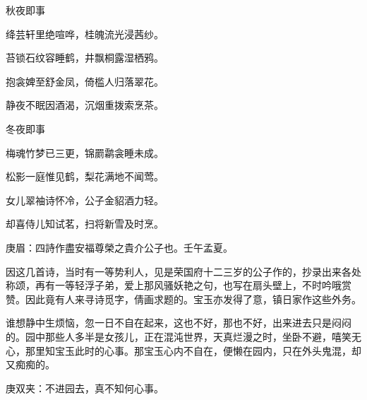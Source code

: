 \begin{poem}
    \begin{pl}秋夜即事\end{pl}

    \begin{pl}绛芸轩里绝喧哗，桂魄流光浸茜纱。\end{pl}

    \begin{pl}苔锁石纹容睡鹤，井飘桐露湿栖鸦。\end{pl}

    \begin{pl}抱衾婢至舒金凤，倚槛人归落翠花。\end{pl}

    \begin{pl}静夜不眠因酒渴，沉烟重拨索烹茶。\end{pl}

\end{poem}


\begin{poem}
    \begin{pl}冬夜即事\end{pl}

    \begin{pl}梅魂竹梦已三更，锦罽鹴衾睡未成。\end{pl}

    \begin{pl}松影一庭惟见鹤，梨花满地不闻莺。\end{pl}

    \begin{pl}女儿翠袖诗怀冷，公子金貂酒力轻。\end{pl}

    \begin{pl}却喜侍儿知试茗，扫将新雪及时烹。\end{pl}\begin{note}庚眉：四詩作盡安福尊榮之貴介公子也。壬午孟夏。\end{note}
\end{poem}


\begin{parag}
    因这几首诗，当时有一等势利人，见是荣国府十二三岁的公子作的，抄录出来各处称颂，再有一等轻浮子弟，爱上那风骚妖艳之句，也写在扇头壁上，不时吟哦赏赞。因此竟有人来寻诗觅字，倩画求题的。宝玉亦发得了意，镇日家作这些外务。
\end{parag}


\begin{parag}
    谁想静中生烦恼，忽一日不自在起来，这也不好，那也不好，出来进去只是闷闷的。园中那些人多半是女孩儿，正在混沌世界，天真烂漫之时，坐卧不避，嘻笑无心，那里知宝玉此时的心事。那宝玉心内不自在，便懒在园内，只在外头鬼混，却又痴痴的。\begin{note}庚双夹：不进园去，真不知何心事。\end{note}
\end{parag}


